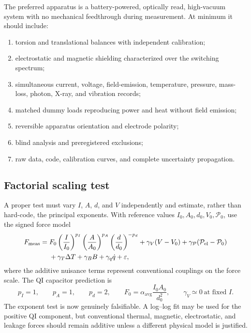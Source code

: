 \documentclass[11pt]{article}
\begin{document}
The preferred apparatus is a battery-powered, optically read, high-vacuum system with no mechanical feedthrough during measurement. At minimum it should include:
\begin{enumerate}[leftmargin=1.55em]
    \item torsion and translational balances with independent calibration;
    \item electrostatic and magnetic shielding characterized over the switching spectrum;
    \item simultaneous current, voltage, field-emission, temperature, pressure, mass-loss, photon, X-ray, and vibration records;
    \item matched dummy loads reproducing power and heat without field emission;
    \item reversible apparatus orientation and electrode polarity;
    \item blind analysis and preregistered exclusions;
    \item raw data, code, calibration curves, and complete uncertainty propagation.
\end{enumerate}

\subsection{Factorial scaling test}

A proper test must vary \(I\), \(A\), \(d\), and \(V\) independently and estimate, rather than hard-code, the principal exponents. With reference values \(I_0,A_0,d_0,V_0,\mathcal P_0\), use the signed force model
\begin{align}
    F_{\mathrm{meas}}={}&
    F_0
    \left(\frac{I}{I_0}\right)^{p_I}
    \left(\frac{A}{A_0}\right)^{p_A}
    \left(\frac{d}{d_0}\right)^{-p_d}
    +\gamma_V(V-V_0)
    +\gamma_{\mathcal P}(\mathcal P_{\mathrm{el}}-\mathcal P_0)
    \notag\\
    &+\gamma_T\Delta T
    +\gamma_B B
    +\gamma_q\dot q
    +\varepsilon,
    \label{eq:factorial_model}
\end{align}
where the additive nuisance terms represent conventional couplings on the force scale. The QI capacitor prediction is
\begin{equation}
    p_I=1,
    \qquad
    p_A=1,
    \qquad
    p_d=2,
    \qquad
    F_0=\alpha_{\mathrm{avg}}\frac{I_0A_0}{d_0^2},
    \qquad
    \gamma_V\simeq0\ \text{at fixed }I.
    \label{eq:capacitor_exponent_predictions}
\end{equation}
The exponent test is now genuinely falsifiable. A log--log fit may be used for the positive QI component, but conventional thermal, magnetic, electrostatic, and leakage forces should remain additive unless a different physical model is justified.
\end{document}
